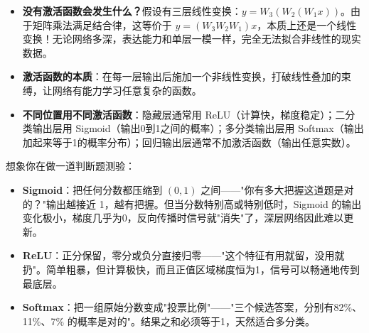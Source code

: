 \documentclass[a4paper,11pt]{ctexart}
\begin{document}
\begin{beginnerbox}
    \begin{itemize}
        \item \textbf{没有激活函数会发生什么？}假设有三层线性变换：$y = W_3(W_2(W_1 x))$。由于矩阵乘法满足结合律，这等价于 $y = (W_3 W_2 W_1) x$，本质上还是一个线性变换！无论网络多深，表达能力和单层一模一样，完全无法拟合非线性的现实数据。
        \item \textbf{激活函数的本质}：在每一层输出后施加一个非线性变换，打破线性叠加的束缚，让网络有能力学习任意复杂的函数。
        \item \textbf{不同位置用不同激活函数}：隐藏层通常用 ReLU（计算快，梯度稳定）；二分类输出层用 Sigmoid（输出0到1之间的概率）；多分类输出层用 Softmax（输出加起来等于1的概率分布）；回归输出层通常不加激活函数（输出任意实数）。
    \end{itemize}
\end{beginnerbox}

\begin{metaphorbox}
    想象你在做一道判断题测验：

    \begin{itemize}
        \item \textbf{Sigmoid}：把任何分数都压缩到 $(0, 1)$ 之间——"你有多大把握这道题是对的？"输出越接近 1，越有把握。但当分数特别高或特别低时，Sigmoid 的输出变化极小，梯度几乎为0，反向传播时信号就"消失"了，深层网络因此难以更新。
        \item \textbf{ReLU}：正分保留，零分或负分直接归零——"这个特征有用就留，没用就扔"。简单粗暴，但计算极快，而且正值区域梯度恒为1，信号可以畅通地传到最底层。
        \item \textbf{Softmax}：把一组原始分数变成"投票比例"——"三个候选答案，分别有82\%、11\%、7\% 的概率是对的"。结果之和必须等于1，天然适合多分类。
    \end{itemize}
\end{metaphorbox}
\end{document}

